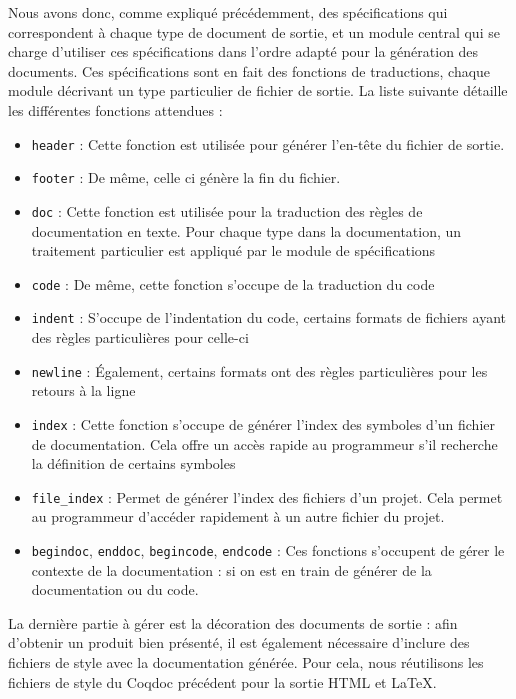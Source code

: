 \documentclass[a4paper, 11pt]{report}
\begin{document}
    Nous avons donc, comme expliqué précédemment, des spécifications qui
    correspondent à chaque type de document de sortie, et un module central
    qui se charge d'utiliser ces spécifications dans l'ordre adapté pour la
    génération des documents. Ces spécifications sont en fait des fonctions
    de traductions, chaque module décrivant un type particulier de fichier
    de sortie. La liste suivante détaille les différentes fonctions
    attendues :
    \begin{itemize}
      \item \texttt{header}     :
        Cette fonction est utilisée pour générer l'en-tête du fichier de
        sortie.
      \item \texttt{footer}     :
        De même, celle ci génère la fin du fichier.
      \item \texttt{doc}        :
        Cette fonction est utilisée pour la traduction des règles de
        documentation en texte. Pour chaque type dans la documentation, un
        traitement particulier est appliqué par le module de spécifications
      \item \texttt{code}       :
        De même, cette fonction s'occupe de la traduction du code
      \item \texttt{indent}     :
        S'occupe de l'indentation du code, certains formats de fichiers ayant des
        règles particulières pour celle-ci
      \item \texttt{newline}    :
        Également, certains formats ont des règles particulières pour les
        retours à la ligne
      \item \texttt{index}      :
        Cette fonction s'occupe de générer l'index des symboles d'un fichier
        de documentation. Cela offre un accès rapide au programmeur s'il
        recherche la définition de certains symboles
      \item \texttt{file\_index} :
        Permet de générer  l'index des fichiers d'un projet. Cela permet
        au programmeur d'accéder rapidement à un autre fichier du projet.

      \item \texttt{begindoc}, \texttt{enddoc}, \texttt{begincode}, \texttt{endcode} :
        Ces fonctions s'occupent de gérer le contexte de la documentation :
        si on est en train de générer de la documentation ou du code.
    \end{itemize}

    La dernière partie à gérer est la décoration des documents de sortie :
    afin d'obtenir un produit bien présenté, il est également nécessaire
    d'inclure des fichiers de style avec la documentation générée. Pour cela,
    nous réutilisons les fichiers de style du Coqdoc précédent pour la sortie
    HTML et LaTeX.
\end{document}
